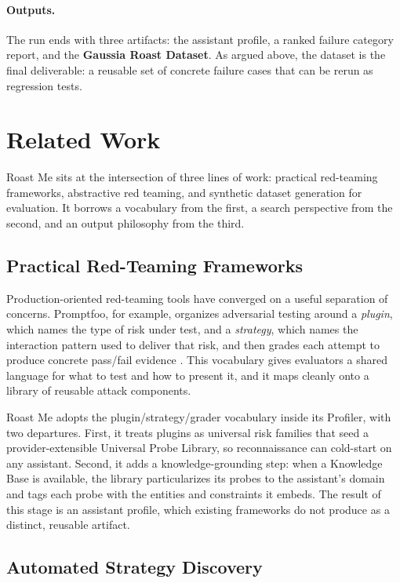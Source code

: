 \documentclass[11pt,a4paper]{article}
\begin{document}
\paragraph{Outputs.}
The run ends with three artifacts: the assistant profile, a ranked failure
category report, and the \textbf{Gaussia Roast Dataset}. As argued above, the
dataset is the final deliverable: a reusable set of concrete failure cases that
can be rerun as regression tests.

\section{Related Work}

Roast Me sits at the intersection of three lines of work: practical red-teaming
frameworks, abstractive red teaming, and synthetic dataset generation for
evaluation. It borrows a vocabulary from the first, a search perspective from the
second, and an output philosophy from the third.

\subsection{Practical Red-Teaming Frameworks}

Production-oriented red-teaming tools have converged on a useful separation of
concerns. Promptfoo, for example, organizes adversarial testing around a
\emph{plugin}, which names the type of risk under test, and a \emph{strategy},
which names the interaction pattern used to deliver that risk, and then grades
each attempt to produce concrete pass/fail evidence \citep{promptfoo2026redteam}.
This vocabulary gives evaluators a shared language for what to test and how to
present it, and it maps cleanly onto a library of reusable attack components.

Roast Me adopts the plugin/strategy/grader vocabulary inside its Profiler, with
two departures. First, it treats plugins as universal risk families that seed a
provider-extensible Universal Probe Library, so reconnaissance can cold-start on
any assistant. Second, it adds a knowledge-grounding step: when a Knowledge Base
is available, the library particularizes its probes to the assistant's domain and
tags each probe with the entities and constraints it embeds. The result of this
stage is an assistant profile, which existing frameworks do not produce as a
distinct, reusable artifact.

\subsection{Automated Strategy Discovery}
\end{document}
